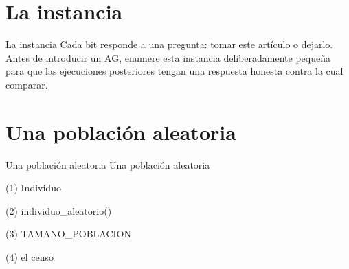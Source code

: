 \section{La instancia}

\begin{frame}{La instancia}
Cada bit responde a una pregunta: tomar este artículo o dejarlo. Antes de introducir un
AG, enumere esta instancia deliberadamente pequeña para que las ejecuciones posteriores tengan una
respuesta honesta contra la cual comparar.
\end{frame}


\section{Una población aleatoria}

\begin{frame}{Una población aleatoria}
Una población aleatoria
\end{frame}

\begin{frame}[fragile]{(1) Individuo}

\end{frame}

\begin{frame}[fragile]{(2) individuo\_aleatorio()}

\end{frame}

\begin{frame}[fragile]{(3) TAMANO\_POBLACION}

\end{frame}

\begin{frame}[fragile]{(4) el censo}

\end{frame}


